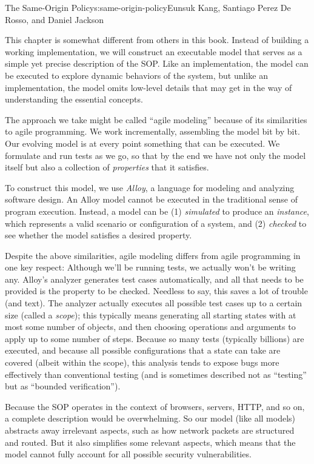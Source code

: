 \begin{aosachapter}{The Same-Origin Policy}{s:same-origin-policy}{Eunsuk Kang, Santiago Perez De Rosso, and Daniel Jackson}
\label{modeling-with-alloy}

This chapter is somewhat different from others in this book. Instead of
building a working implementation, we will construct an executable model
that serves as a simple yet precise description of the SOP. Like an
implementation, the model can be executed to explore dynamic behaviors
of the system, but unlike an implementation, the model omits low-level
details that may get in the way of understanding the essential concepts.

The approach we take might be called ``agile modeling'' because of its
similarities to agile programming. We work incrementally, assembling the
model bit by bit. Our evolving model is at every point something that
can be executed. We formulate and run tests as we go, so that by the end
we have not only the model itself but also a collection of
\emph{properties} that it satisfies.

To construct this model, we use \emph{Alloy}, a language for modeling
and analyzing software design. An Alloy model cannot be executed in the
traditional sense of program execution. Instead, a model can be (1)
\emph{simulated} to produce an \emph{instance}, which represents a valid
scenario or configuration of a system, and (2) \emph{checked} to see
whether the model satisfies a desired property.

Despite the above similarities, agile modeling differs from agile
programming in one key respect: Although we'll be running tests, we
actually won't be writing any. Alloy's analyzer generates test cases
automatically, and all that needs to be provided is the property to be
checked. Needless to say, this saves a lot of trouble (and text). The
analyzer actually executes all possible test cases up to a certain size
(called a \emph{scope}); this typically means generating all starting
states with at most some number of objects, and then choosing operations
and arguments to apply up to some number of steps. Because so many tests
(typically billions) are executed, and because all possible
configurations that a state can take are covered (albeit within the
scope), this analysis tends to expose bugs more effectively than
conventional testing (and is sometimes described not as ``testing'' but
as ``bounded verification'').

\label{simplifications}

Because the SOP operates in the context of browsers, servers, HTTP, and
so on, a complete description would be overwhelming. So our model (like
all models) abstracts away irrelevant aspects, such as how network
packets are structured and routed. But it also simplifies some relevant
aspects, which means that the model cannot fully account for all
possible security vulnerabilities.


\end{aosachapter}
